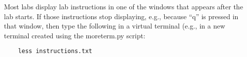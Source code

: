 \documentclass[12pt]{article}
\begin{document}
Most labs display lab instructions in one of the windows that appears after the lab starts.  If those instructions
stop displaying, e.g., because ``q'' is pressed in that window, then type the following in a virtual terminal (e.g.,
in a new terminal created using the moreterm.py script:
\begin{verbatim}
    less instructions.txt
\end{verbatim}
\end{document}
